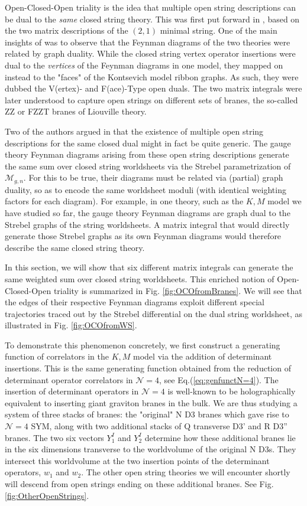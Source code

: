 \documentclass[english]{article}
\renewcommand{\>}{\rangle}
\newcommand{\<}{\langle}
\renewcommand{\(}{\left(}
\renewcommand{\)}{\right)}
\begin{document}
Open-Closed-Open triality is the idea that multiple open string descriptions can be dual to the \textit{same} closed string theory. This was first put forward in \cite{Joburg}, based on the two matrix descriptions of the $(2,1)$ minimal string. One of the main insights of \cite{Joburg} was to observe that the Feynman diagrams of the two theories were related by graph duality. While the closed string vertex operator insertions were dual to the \textit{vertices} of the Feynman diagrams in one model, they mapped on instead to the "faces" of the Kontsevich model ribbon graphs. As such, they were dubbed the V(ertex)- and F(ace)-Type open duals. The two matrix integrals were later understood to capture open strings on different sets of branes, the so-called ZZ or FZZT branes of Liouville theory. 


Two of the authors argued in \cite{DSDI} that the existence of multiple open string descriptions for the same closed dual might in fact be quite generic. The gauge theory Feynman diagrams arising from these open string descriptions generate the same sum over closed string worldsheets via the Strebel parametrization of $\mathcal{M}_{g,n}$. For this to be true, their diagrams must be related via (partial) graph duality, so as to encode the same worldsheet moduli (with identical weighting factors for each diagram). For example, in one theory, such as the $K,M$ model we have studied so far, the gauge theory Feynman diagrams are graph dual to the Strebel graphs of the string worldsheets. A matrix integral that would directly generate those Strebel graphs as its own Feynman diagrams would therefore describe the same closed string theory.

In this section, we will show that six different matrix integrals can generate the same weighted sum over closed string worldsheets. This enriched notion of Open-Closed-Open triality is summarized in Fig. \ref{fig:OCOfromBranes}. We will see that the edges of their respective Feynman diagrams exploit different special trajectories traced out by the Strebel differential on the dual string worldsheet, as illustrated in Fig. \ref{fig:OCOfromWS}. 

To demonstrate this phenomenon concretely, we first construct a generating function of correlators in the $K, M$ model via the addition of determinant insertions. This is the same generating function obtained from the reduction of determinant operator correlators in $\mathcal{N}=4$, see Eq.(\ref{eq:genfunctN=4}). The insertion of determinant operators in $\mathcal{N}=4$ is well-known to be holographically equivalent to inserting giant graviton branes in the bulk. We are thus studying a system of three stacks of branes: the "original" N D3 branes which gave rise to $\mathcal{N}=4$ SYM, along with two additional stacks of Q transverse D3' and R D3'' branes. The two six vectors $Y_{1}^{I}$ and $Y^{I}_{2}$ determine how these additional branes lie in the six dimensions transverse to the worldvolume of the original N D3s. They intersect this worldvolume at the two insertion points of the determinant operators, $w_1$ and $w_2$. The other open string theories we will encounter shortly will descend from open strings ending on these additional branes. See Fig. \ref{fig:OtherOpenStrings}. 
\end{document}
